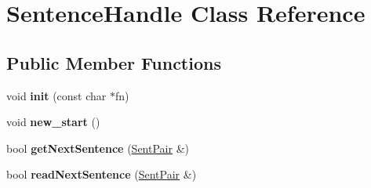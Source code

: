 \hypertarget{classSentenceHandle}{\section{\-Sentence\-Handle \-Class \-Reference}
\label{classSentenceHandle}
}
\subsection*{\-Public \-Member \-Functions}
\begin{DoxyCompactItemize}
\item 
\hypertarget{classSentenceHandle_ab33e63caa1df82f770f4893e4b7822a0}{void {\bfseries init} (const char $\ast$fn)}\label{classSentenceHandle_ab33e63caa1df82f770f4893e4b7822a0}

\item 
\hypertarget{classSentenceHandle_a9cf568423971e1fd47b20dfbc70e2bcd}{void {\bfseries new\-\_\-start} ()}\label{classSentenceHandle_a9cf568423971e1fd47b20dfbc70e2bcd}

\item 
\hypertarget{classSentenceHandle_ab96282968559bfca931698cca25f551a}{bool {\bfseries get\-Next\-Sentence} (\hyperlink{classSentPair}{\-Sent\-Pair} \&)}\label{classSentenceHandle_ab96282968559bfca931698cca25f551a}

\item 
\hypertarget{classSentenceHandle_abfb1c22bd0a6b199f726e9225909ab7e}{bool {\bfseries read\-Next\-Sentence} (\hyperlink{classSentPair}{\-Sent\-Pair} \&)}\label{classSentenceHandle_abfb1c22bd0a6b199f726e9225909ab7e}

\end{DoxyCompactItemize}
